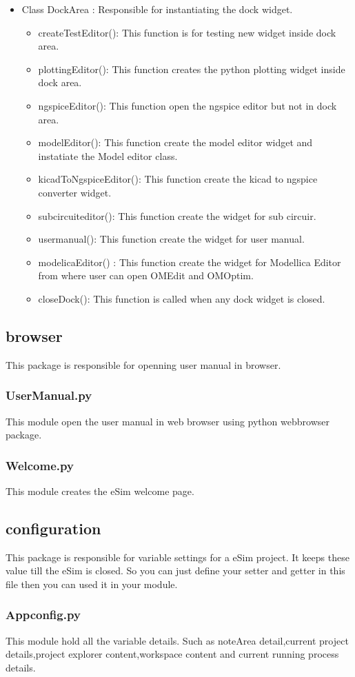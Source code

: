 \documentclass[12pt]{article}
\begin{document}
\begin{itemize}
	\item Class DockArea : Responsible for instantiating the dock widget.
	\begin{itemize}
		\item createTestEditor(): This function is for testing new widget inside dock area.
		\item plottingEditor(): This function creates the python plotting widget inside dock area.
		\item ngspiceEditor(): This function open the ngspice editor but not in dock area.
		\item modelEditor(): This function create the model editor widget and instatiate the Model editor class.
		\item kicadToNgspiceEditor(): This function create the kicad to ngspice converter widget.
		\item subcircuiteditor(): This function create the widget for sub circuir.
		\item usermanual(): This function create the widget for user manual.
		\item modelicaEditor() : This function create the widget for Modellica Editor from where user can open OMEdit and OMOptim.
		\item closeDock(): This function is called when any dock widget is closed.
		
	\end{itemize}

\end{itemize}
\newpage

\subsection{browser}
This package is responsible for openning user manual in browser.

\subsubsection{UserManual.py}
This module open the user manual in web browser using python webbrowser package.

\subsubsection{Welcome.py}
This module creates the eSim welcome page.

\subsection{configuration}
This package is responsible for variable settings for a eSim project. It keeps these value till the eSim is closed. So you can just define your setter and getter in this file then you can used it in your module.

\subsubsection{Appconfig.py}
This module hold all the variable details. Such as noteArea detail,current project details,project explorer content,workspace content and current running process details.
\end{document}
